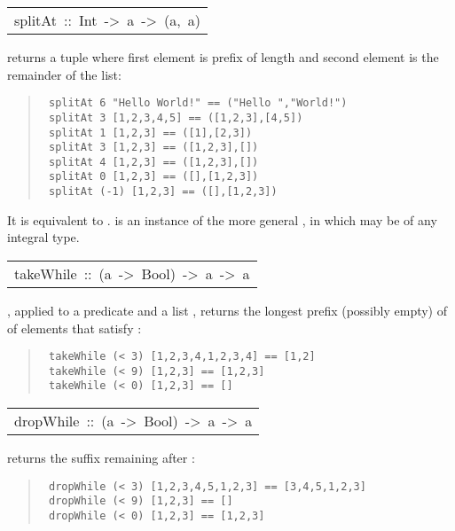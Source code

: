 \begin{haddockdesc}
\item[\begin{tabular}{@{}l}
splitAt\ ::\ Int\ ->\ {\char 91}a{\char 93}\ ->\ ({\char 91}a{\char 93},\ {\char 91}a{\char 93})
\end{tabular}]\haddockbegindoc
{}  returns a tuple where first element is  prefix of
 length  and second element is the remainder of the list:
\par
\begin{quote}
{\haddockverb\begin{verbatim}
 splitAt 6 "Hello World!" == ("Hello ","World!")
 splitAt 3 [1,2,3,4,5] == ([1,2,3],[4,5])
 splitAt 1 [1,2,3] == ([1],[2,3])
 splitAt 3 [1,2,3] == ([1,2,3],[])
 splitAt 4 [1,2,3] == ([1,2,3],[])
 splitAt 0 [1,2,3] == ([],[1,2,3])
 splitAt (-1) [1,2,3] == ([],[1,2,3])
\end{verbatim}}
\end{quote}
It is equivalent to .
  is an instance of the more general ,
 in which  may be of any integral type.
\par

\end{haddockdesc}
\begin{haddockdesc}
\item[\begin{tabular}{@{}l}
takeWhile\ ::\ (a\ ->\ Bool)\ ->\ {\char 91}a{\char 93}\ ->\ {\char 91}a{\char 93}
\end{tabular}]\haddockbegindoc
{}, applied to a predicate  and a list , returns the
 longest prefix (possibly empty) of  of elements that satisfy :
\par
\begin{quote}
{\haddockverb\begin{verbatim}
 takeWhile (< 3) [1,2,3,4,1,2,3,4] == [1,2]
 takeWhile (< 9) [1,2,3] == [1,2,3]
 takeWhile (< 0) [1,2,3] == []
\end{verbatim}}
\end{quote}

\end{haddockdesc}
\begin{haddockdesc}
\item[\begin{tabular}{@{}l}
dropWhile\ ::\ (a\ ->\ Bool)\ ->\ {\char 91}a{\char 93}\ ->\ {\char 91}a{\char 93}
\end{tabular}]\haddockbegindoc
{}  returns the suffix remaining after  :
\par
\begin{quote}
{\haddockverb\begin{verbatim}
 dropWhile (< 3) [1,2,3,4,5,1,2,3] == [3,4,5,1,2,3]
 dropWhile (< 9) [1,2,3] == []
 dropWhile (< 0) [1,2,3] == [1,2,3]
\end{verbatim}}
\end{quote}

\end{haddockdesc}
